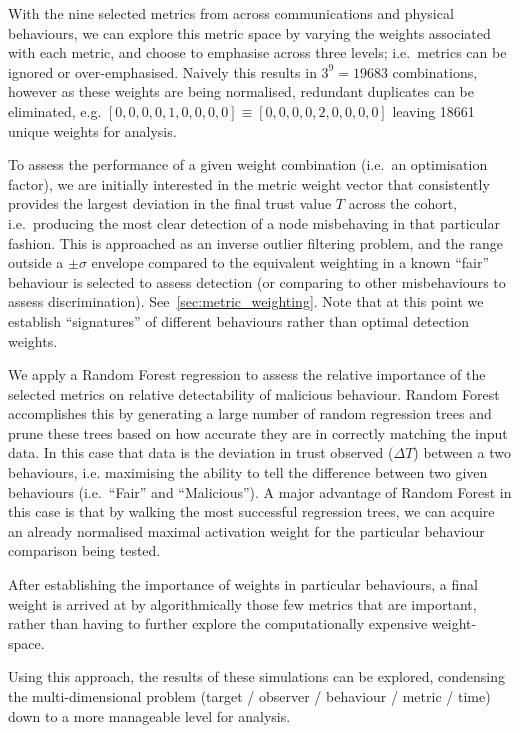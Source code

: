 With the nine selected metrics from across communications and physical behaviours, we can explore this metric space by varying the weights associated with each metric, and choose to emphasise across three levels; i.e.\ metrics can be ignored or over-emphasised. Naively this results in $3^9 = 19683$ combinations, however as these weights are being normalised, redundant duplicates can be eliminated, e.g. $[0,0,0,0,1,0,0,0,0] \equiv [0,0,0,0,2,0,0,0,0]$ leaving 18661 unique weights for analysis.

To assess the performance of a given weight combination (i.e.\ an optimisation factor), we are initially interested in the metric weight vector that consistently provides the largest deviation in the final trust value $T$ across the cohort, i.e.\ producing the most clear detection of a node misbehaving in that particular fashion.
This is approached as an inverse outlier filtering problem, and the range outside a $\pm\sigma$ envelope compared to the equivalent weighting in a known ``fair'' behaviour is selected to assess detection (or comparing to other misbehaviours to assess discrimination).
See~\autoref{sec:metric_weighting}.
Note that at this point we establish ``signatures'' of different behaviours rather than optimal detection weights.

We apply a Random Forest regression \cite{Breiman2001} to assess the relative importance of the selected metrics on relative detectability of malicious behaviour. 
Random Forest accomplishes this by generating a large number of random regression trees and prune these trees based on how accurate they are in correctly matching the input data.
In this case that data is the deviation in trust observed ($\Delta T$) between a two behaviours, i.e. maximising the ability to tell the difference between two given behaviours (i.e.\ ``Fair'' and ``Malicious'').
A major advantage of Random Forest in this case is that by walking the most successful regression trees, we can acquire an already normalised maximal activation weight for the particular behaviour comparison being tested.

After establishing the importance of weights in particular behaviours, a final weight is arrived at by algorithmically those few metrics that are important, rather than having to further explore the computationally expensive weight-space.

Using this approach, the results of these simulations can be explored, condensing the multi-dimensional problem (target / observer / behaviour / metric / time) down to a more manageable level for analysis.


